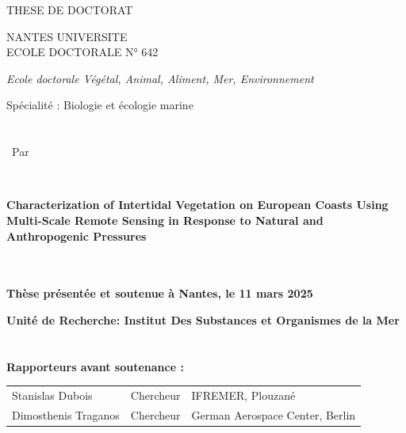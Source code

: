 \documentclass[
  letterpaper,
  11pt,
  english,
  singlespacing,
  headsepline]{MastersDoctoralThesis}
\begin{document}
\begin{titlepage}
\AddToShipoutPictureBG*{%
    \BackgroundImage
}

\vspace{1.2cm}

{\LARGE {\Huge T}HESE DE DOCTORAT}

\vspace{1.8cm}
{\fontsize{14}{18}\selectfont NANTES UNIVERSITE} \\

{\large E}COLE {\large D}OCTORALE N° 642


{\fontsize{12}{16}\selectfont \textit{Ecole doctorale Végétal, Animal, Aliment, Mer, Environnement}}

{\fontsize{12}{16}\selectfont Spécialité : Biologie et écologie marine} \\\\\\

{\fontsize{12}{16}\ Par}
\vspace{0.2cm}

 \\

\parbox{17cm}{
{\fontsize{16}{20}\selectfont \textbf{Characterization of Intertidal Vegetation on European Coasts Using Multi-Scale Remote Sensing in Response to Natural and Anthropogenic Pressures} }
}\\\\

{\fontsize{11}{15}\selectfont \textbf{Thèse présentée et soutenue à Nantes, le 11 mars 2025}}

{\fontsize{11}{15}\selectfont \textbf{Unité de Recherche: Institut Des Substances et Organismes de la Mer}}
\\\\\\

{\fontsize{12}{16}\selectfont \textbf{Rapporteurs avant soutenance :}}

\begin{tabular}{@{}l l l@{}}
    {\fontsize{10}{14}\selectfont \textcolor{textgray}{Stanislas Dubois}} & 
    {\fontsize{10}{14}\selectfont \textcolor{textgray}{Chercheur}} & 
    {\fontsize{10}{14}\selectfont \textcolor{textgray}{IFREMER, Plouzané}} \\

    {\fontsize{10}{14}\selectfont \textcolor{textgray}{Dimosthenis Traganos}} & 
    {\fontsize{10}{14}\selectfont \textcolor{textgray}{Chercheur}} & 
    {\fontsize{10}{14}\selectfont \textcolor{textgray}{German Aerospace Center, Berlin}} \\


\end{tabular}
\end{titlepage}
\end{document}
